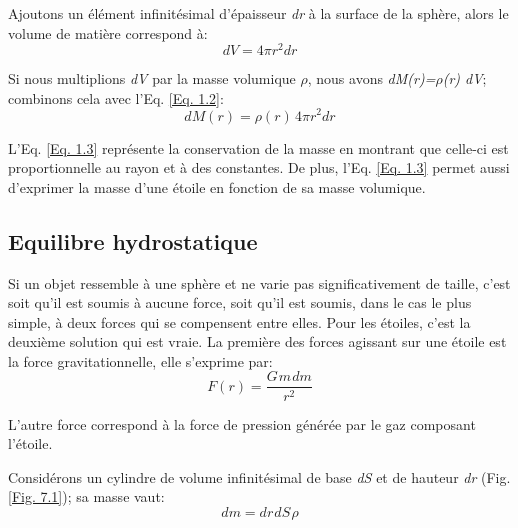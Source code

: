 Ajoutons un élément infinitésimal d'épaisseur \textit{dr} à la surface de la sphère, alors le volume de matière correspond à:\begin{equation} dV=4\pi r^{2}dr\label{Eq. 1.2}\end{equation}

Si nous multiplions \textit{dV} par la masse volumique \textit{$\rho$}, nous avons\textit{ dM(r)=$\rho$(r) dV}; combinons cela avec l'Eq. \ref{Eq. 1.2}:\begin{equation} \boxed{dM(r)=\rho(r)\hspace{2pt}4\pi r^{2}dr}\label{Eq.
	1.3}\end{equation}


\vfill
{}

L'Eq. \ref{Eq. 1.3} représente la conservation de la masse en montrant que celle-ci est proportionnelle au rayon et à des constantes. De plus, l'Eq. \ref{Eq. 1.3} permet aussi d'exprimer la masse d'une étoile en fonction de sa masse volumique.

\subsection{Equilibre hydrostatique}\label{1.1.2}

Si un objet ressemble à une sphère et ne varie pas significativement de taille, c'est soit qu'il est soumis à aucune force, soit qu'il est soumis, dans le cas le plus simple, à deux forces qui se compensent entre elles. Pour les étoiles, c'est la deuxième solution qui est vraie. La première des forces agissant sur une étoile est la force gravitationnelle, elle s'exprime par: \begin{equation} F(r)=\frac{G\hspace{1pt}m\hspace{1pt}dm}{r^{2}}\label{Eq. 1.4}\end{equation}

L'autre force correspond à la force de pression générée par le gaz composant l'étoile.\smallskip

Considérons un cylindre de volume infinitésimal de base \textit{dS} et de hauteur \textit{dr} (Fig. \ref{Fig. 7.1}); sa masse vaut:\begin{equation}dm=dr\hspace{1pt}dS\hspace{1pt}\rho\label{Eq. 1.5}\end{equation} 

